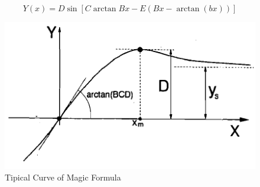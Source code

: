 { \begin{equation}\label{eqn:magic}
 Y(x)=D\sin[C \arctan{Bx -E(Bx-\arctan(bx))}]
 \end{equation}
\begin{figure}
	\centering
	\includegraphics{Chapter3/fig/magicformula}
	\caption{Tipical Curve of Magic Formula \cite{pacejka1992magic}}
	\label{fig:magicformula}
\end{figure}

}
